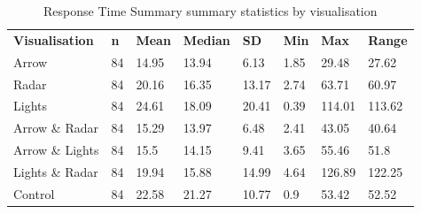 \begin{table}[]
\caption{Response Time Summary summary statistics by visualisation}
\label{tab:Response_Time_Summary}
\begin{tabular}{llllllll}
\textbf{Visualisation} & \textbf{n} & \textbf{Mean} & \textbf{Median} & \textbf{SD} & \textbf{Min} & \textbf{Max} & \textbf{Range} \\
Arrow                  & 84         & 14.95         & 13.94           & 6.13        & 1.85         & 29.48        & 27.62 \\
Radar                  & 84         & 20.16         & 16.35           & 13.17       & 2.74         & 63.71        & 60.97 \\
Lights                 & 84         & 24.61         & 18.09           & 20.41       & 0.39         & 114.01       & 113.62 \\
Arrow \& Radar         & 84         & 15.29         & 13.97           & 6.48        & 2.41         & 43.05        & 40.64 \\
Arrow \& Lights        & 84         & 15.5          & 14.15           & 9.41        & 3.65         & 55.46        & 51.8 \\
Lights \& Radar        & 84         & 19.94         & 15.88           & 14.99       & 4.64         & 126.89       & 122.25 \\
Control                & 84         & 22.58         & 21.27           & 10.77       & 0.9          & 53.42        & 52.52
\end{tabular}
\end{table}

